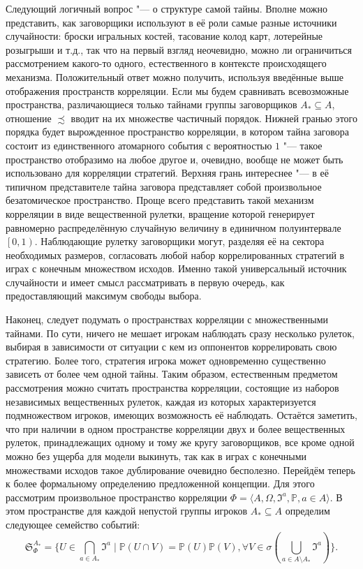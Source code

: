 Следующий логичный вопрос "--- о структуре самой тайны. Вполне можно представить, как заговорщики используют в её роли самые разные источники случайности: броски игральных костей, тасование колод карт, лотерейные розыгрыши и т.д., так что на первый взгляд неочевидно, можно ли ограничиться рассмотрением какого-то одного, естественного в контексте происходящего механизма. Положительный ответ можно получить, используя введённые выше отображения пространств корреляции. Если мы будем сравнивать всевозможные пространства, различающиеся только тайнами группы заговорщиков $A_* \subseteq A$, отношение $\precsim$ вводит на их множестве частичный порядок. Нижней гранью этого порядка будет вырожденное пространство корреляции, в котором тайна заговора состоит из единственного атомарного события с вероятностью $1$ "--- такое пространство отобразимо на любое другое и, очевидно, вообще не может быть использовано для корреляции стратегий. Верхняя грань интереснее "--- в её типичном представителе тайна заговора представляет собой произвольное безатомическое \cite[с.~81]{Bogachev} пространство. Проще всего представить такой механизм корреляции в виде вещественной рулетки, вращение которой генерирует равномерно распределённую случайную величину в единичном полуинтервале $\left[0, 1\right)$. Наблюдающие рулетку заговорщики могут, разделяя её на сектора необходимых размеров, согласовать любой набор коррелированных стратегий в играх с конечным множеством исходов. Именно такой универсальный источник случайности и имеет смысл рассматривать в первую очередь, как предоставляющий максимум свободы выбора.

Наконец, следует подумать о пространствах корреляции с множественными тайнами. По сути, ничего не мешает игрокам наблюдать сразу несколько рулеток, выбирая в зависимости от ситуации с кем из оппонентов коррелировать свою стратегию. Более того, стратегия игрока может одновременно существенно зависеть от более чем одной тайны. Таким образом, естественным предметом рассмотрения можно считать пространства корреляции, состоящие из наборов независимых вещественных рулеток, каждая из которых характеризуется подмножеством игроков, имеющих возможность её наблюдать. Остаётся заметить, что при наличии в одном пространстве корреляции двух и более вещественных рулеток, принадлежащих одному и тому же кругу заговорщиков, все кроме одной можно без ущерба для модели выкинуть, так как в играх с конечными множествами исходов такое дублирование очевидно бесполезно. Перейдём теперь к более формальному определению предложенной концепции. Для этого рассмотрим произвольное пространство корреляции $\Phi = \langle A, \Omega, \mathfrak{I}^a, \mathbb{P}, a \in A \rangle$. В этом пространстве для каждой непустой группы игроков $A_* \subseteq A$ определим следующее семейство событий:
\begin{equation*}
	\mathfrak{S}_\Phi^{A_*} = \{U \in \bigcap\limits_{a \in A_*} \mathfrak{I}^a \mid \mathbb{P}(U \cap V) = \mathbb{P}(U) \mathbb{P}(V), \forall V \in \sigma(\bigcup\limits_{a \in A \setminus A_*} \mathfrak{I}^a)\}.
\end{equation*}

